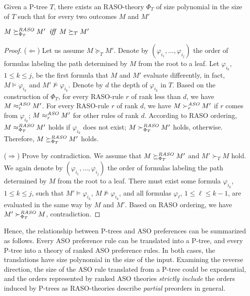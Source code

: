 \begin{thm}
\label{thm:P_RASO}
	Given a P-tree $T$, there exists an RASO-theory $\Phi_T$ of size
	polynomial in the size of $T$ such that for every two outcomes $M$ and $M'$
	\begin{center}
		$M \succeq_{\Phi_T}^{\textit{RASO}} M' \;\; \textit{iff} \;\; M \succeq_{T} M'$
	\end{center}
\end{thm}
\begin{proof}
($\Leftarrow$) Let us assume $M \succeq_{T} M'$.
Denote by $(\varphi_{i_1},\ldots,\varphi_{i_j})$ the order of formulas 
labeling the path determined by $M$ from the root to a leaf.
Let $\varphi_{i_k}$, $1 \leq k \leq j$, be the first formula that
$M$ and $M'$ evaluate differently, in fact, $M \models \varphi_{i_k}$
and $M' \not \models \varphi_{i_k}$.
Denote by $d$ the depth of $\varphi_{i_k}$ in $T$.
Based on the construction of $\Phi_T$, 
for every RASO-rule $r$ of rank less than $d$, we have
$M \approx_{r}^{\textit{ASO}} M'$. For every RASO-rule $r$
of rank $d$, we have $M \succ_{r}^{\textit{ASO}} M'$ if
$r$ comes from $\varphi_{i_k}$; $M \approx_{r}^{\textit{ASO}} M'$
for other rules of rank $d$.
According to RASO ordering, $M \approx_{\Phi_T}^{\textit{RASO}} M'$ holds
if $\varphi_{i_k}$ does not exist; $M \succ_{\Phi_T}^{\textit{RASO}} M'$
holds, otherwise.  Therefore, $M \succeq_{\Phi_T}^{\textit{RASO}} M'$ holds.

($\Rightarrow$) Prove by contradiction.  We assume that $M \succeq_{\Phi_T}^{\textit{RASO}} M'$ 
and $M' \succ_{T} M$ hold.
We again denote by $(\varphi_{i_1},\ldots,\varphi_{i_j})$ the order of formulas
labeling the path determined by $M$ from the root to a leaf.
There must exist some formula $\varphi_{i_k}$, $1 \leq k \leq j$, such that
$M' \models \varphi_{i_k}$, $M \not \models \varphi_{i_k}$, and
all formulas $\varphi_\ell$, $1 \leq \ell \leq k-1$, are evaluated in the same way
by $M$ and $M'$. Based on RASO ordering, we have $M' \succ_{\Phi_T}^{\textit{RASO}} M$,
contradiction.
\end{proof}

Hence, the relationship between P-trees and ASO preferences can be summarized as follows.
Every ASO preference rule can be translated into a P-tree, and 
every P-tree into a theory of ranked ASO preference rules.
In both cases, the translations have size polynomial in the size of the input.
Examining the reverse direction, the size of the ASO rule translated from a P-tree
could be exponential, and the orders represented by ranked ASO theories
\emph{strictly include} the orders induced by P-trees as RASO-theories describe
\emph{partial} preorders in general.

